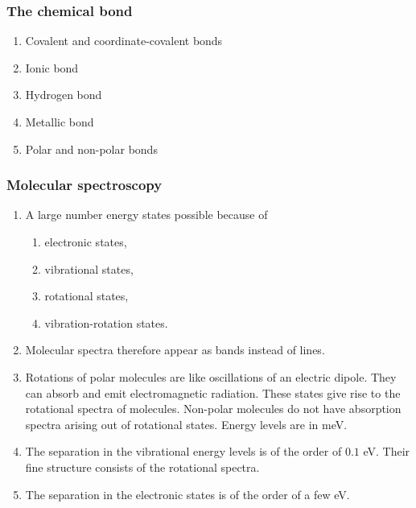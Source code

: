 \documentclass{beamer}
\begin{document}
\begin{frame}
\frametitle{The chemical bond}
\begin{enumerate}
\item Covalent and coordinate-covalent bonds
\item Ionic bond
\item Hydrogen bond
\item Metallic bond
\item Polar and non-polar bonds
\end{enumerate}
\end{frame}

\begin{frame}
\frametitle{Molecular spectroscopy}
\begin{enumerate}
\item A large number energy states possible because of
\begin{enumerate}
\item electronic states,
\item vibrational states,
\item rotational states,
\item vibration-rotation states.
\end{enumerate}
\item Molecular spectra therefore appear as bands instead of lines.
\item Rotations of polar molecules are like oscillations of an electric dipole.
They can absorb and emit electromagnetic radiation. These states give rise to 
the rotational spectra of molecules. Non-polar molecules do not have absorption
spectra arising out of rotational states. Energy levels are in meV.
\item The separation in the vibrational energy levels is of the order of $0.1$
eV. Their fine structure consists of the rotational spectra.
\item The separation in the electronic states is of the order of a few eV.
\end{enumerate}
\end{frame}
\end{document}

